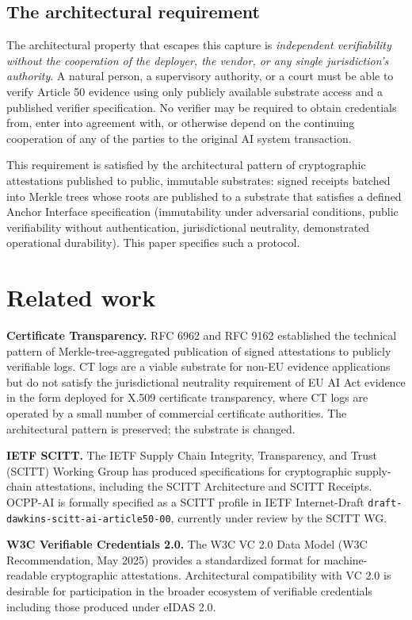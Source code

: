 \documentclass[11pt,a4paper]{article}
\begin{document}
\subsection{The architectural requirement}

The architectural property that escapes this capture is \emph{independent verifiability without the cooperation of the deployer, the vendor, or any single jurisdiction's authority}. A natural person, a supervisory authority, or a court must be able to verify Article 50 evidence using only publicly available substrate access and a published verifier specification. No verifier may be required to obtain credentials from, enter into agreement with, or otherwise depend on the continuing cooperation of any of the parties to the original AI system transaction.

This requirement is satisfied by the architectural pattern of cryptographic attestations published to public, immutable substrates: signed receipts batched into Merkle trees whose roots are published to a substrate that satisfies a defined Anchor Interface specification (immutability under adversarial conditions, public verifiability without authentication, jurisdictional neutrality, demonstrated operational durability). This paper specifies such a protocol.

\section{Related work}

\textbf{Certificate Transparency.} RFC 6962 and RFC 9162 established the technical pattern of Merkle-tree-aggregated publication of signed attestations to publicly verifiable logs. CT logs are a viable substrate for non-EU evidence applications but do not satisfy the jurisdictional neutrality requirement of EU AI Act evidence in the form deployed for X.509 certificate transparency, where CT logs are operated by a small number of commercial certificate authorities. The architectural pattern is preserved; the substrate is changed.

\textbf{IETF SCITT.} The IETF Supply Chain Integrity, Transparency, and Trust (SCITT) Working Group has produced specifications for cryptographic supply-chain attestations, including the SCITT Architecture and SCITT Receipts. OCPP-AI is formally specified as a SCITT profile in IETF Internet-Draft \texttt{draft-dawkins-scitt-ai-article50-00}, currently under review by the SCITT WG.

\textbf{W3C Verifiable Credentials 2.0.} The W3C VC 2.0 Data Model (W3C Recommendation, May 2025) provides a standardized format for machine-readable cryptographic attestations. Architectural compatibility with VC 2.0 is desirable for participation in the broader ecosystem of verifiable credentials including those produced under eIDAS 2.0.
\end{document}
